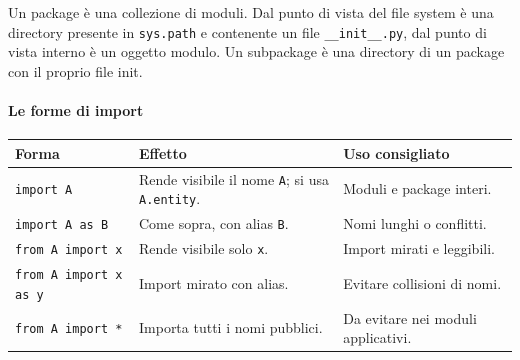 \documentclass[12pt]{extarticle}
\begin{document}
\noindent Un package è una collezione di moduli. Dal punto di vista del file system è una directory presente in \texttt{sys.path} e contenente un file \texttt{\_\_init\_\_.py}, dal punto di vista interno è un oggetto modulo. Un subpackage è una directory di un package con il proprio file init.

\paragraph{Le forme di import}
\begin{center}
\small
\begin{tabular}{p{4.6cm}p{5.0cm}p{5.2cm}}
    \toprule
    \textbf{Forma} & \textbf{Effetto} & \textbf{Uso consigliato} \\
    \midrule
    \texttt{import A} & Rende visibile il nome \texttt{A}; si usa \texttt{A.entity}. & Moduli e package interi. \\
    \addlinespace
    \texttt{import A as B} & Come sopra, con alias \texttt{B}. & Nomi lunghi o conflitti. \\
    \addlinespace
    \texttt{from A import x} & Rende visibile solo \texttt{x}. & Import mirati e leggibili. \\
    \addlinespace
    \texttt{from A import x as y} & Import mirato con alias. & Evitare collisioni di nomi. \\
    \addlinespace
    \texttt{from A import *} & Importa tutti i nomi pubblici. & Da evitare nei moduli applicativi. \\
    \bottomrule
\end{tabular}
\end{center}
\end{document}
